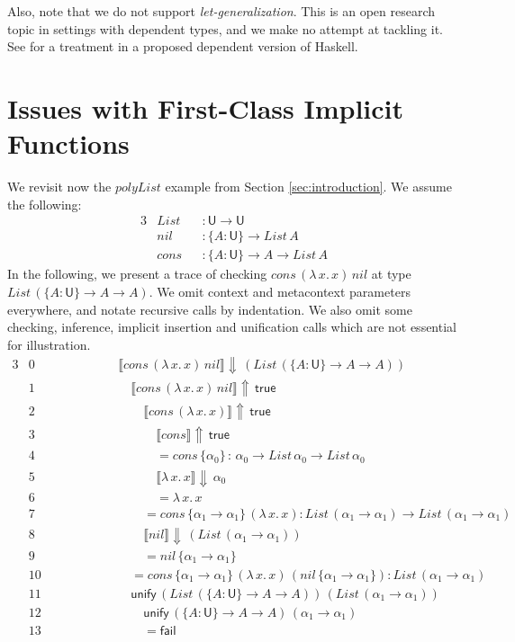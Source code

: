 \documentclass[acmsmall,review,anonymous,prologue,dvipsnames]{acmart}\settopmatter{printfolios=true,printccs=false,printacmref=false}
\renewcommand{\U}{\mathsf{U}}
\newcommand{\unify}{\mathsf{unify}}
\newcommand{\fail}{\mathsf{fail}}
\newcommand{\echeckt}[2]{\llbracket#1\rrbracket\!\Downarrow\,#2}
\newcommand{\einfert}[2]{\llbracket#1\rrbracket\!\Uparrow\,#2}
\newcommand{\true}{\mathsf{true}}
\theoremstyle{remark}
\begin{document}

Also, note that we do not support \emph{let-generalization}. This is an open
research topic in settings with dependent types, and we make no attempt at
tackling it. See \cite{eisenberg2016dependent} for a treatment in a proposed
dependent version of Haskell.

\section{Issues with First-Class Implicit Functions}

We revisit now the $polyList$ example from Section \ref{sec:introduction}. We
assume the following:
\begin{alignat*}{3}
  & List && : \U \to \U \\
  & nil  && : \{A : \U\} \to List\,A\\
  & cons && : \{A : \U\} \to A \to List\,A
\end{alignat*}
In the following, we present a trace of checking $cons\,(\lambda\,x.\,x)\,nil$
at type $List\,(\{A : \U\}\to A \to A)$. We omit context and metacontext
parameters everywhere, and notate recursive calls by indentation. We also omit
some checking, inference, implicit insertion and unification calls which are not
essential for illustration.
\begin{alignat*}{3}
  & \scriptstyle{0 }\qquad\qquad\quad && \echeckt{cons\,(\lambda\,x.\,x)\,nil}{(List\,(\{A : \U\}\to A \to A))}\\
  & \scriptstyle{1 }  && \quad \einfert{cons\,(\lambda\,x.\,x)\,nil}{\true} \\
  & \scriptstyle{2 }  && \qquad \einfert{cons\,(\lambda\,x.\,x)}{\true}\\
  & \scriptstyle{3 }  && \qquad\quad \einfert{cons}{\true}\\
  & \scriptstyle{4 }  && \qquad\quad = cons\,\{\alpha_0\}\,:\,\alpha_0 \to List\,\alpha_0 \to List\,\alpha_0\\
  & \scriptstyle{5 }  && \qquad\quad \echeckt{\lambda\,x.\,x}{\alpha_0}\\
  & \scriptstyle{6 }  && \qquad\quad = \lambda\,x.\,x\\
  & \scriptstyle{7 }  && \qquad = cons\,\{\alpha_1 \to \alpha_1\}\,(\lambda\,x.\,x) : List\,(\alpha_1\to\alpha_1) \to List\,(\alpha_1\to\alpha_1)\\
  & \scriptstyle{8 }  && \qquad \echeckt{nil}{(List\,(\alpha_1\to\alpha_1))}\\
  & \scriptstyle{9 }  && \qquad = nil\,\{\alpha_1\to\alpha_1\}\\
  & \scriptstyle{10} && \quad = cons\,\{\alpha_1 \to \alpha_1\}\,(\lambda\,x.\,x)\,(nil\,\{\alpha_1\to\alpha_1\}): List\,(\alpha_1\to\alpha_1)\\
  & \scriptstyle{11} && \quad \unify\,(List\,(\{A : \U\}\to A \to A))\,(List\,(\alpha_1\to\alpha_1))\\
  & \scriptstyle{12} && \qquad \unify\,(\{A : \U\}\to A \to A)\,(\alpha_1\to\alpha_1)\\
  & \scriptstyle{13} && \qquad = \fail
\end{alignat*}
\end{document}
